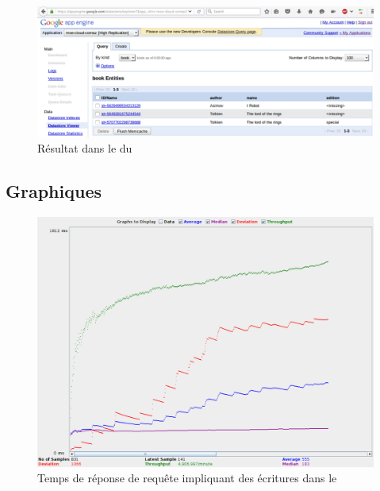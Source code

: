 \documentclass[french]{msereport}
\begin{document}
		\begin{figure}[h]
			\label{ds_viewer_cloud}
			\centering
			\includegraphics[width=\textwidth]{screen_ds_viewer_cloud.png}
			\caption{Résultat dans le  du }
		\end{figure}
	
		\subsection{Graphiques}
			\begin{figure}[h]
				\label{perf_dswrite}
				\centering
				\includegraphics[width=\textwidth]{screen_jmetter_dswrite.png}
				\caption{Temps de réponse de requête impliquant des écritures dans le }
			\end{figure}
			
\end{document}
